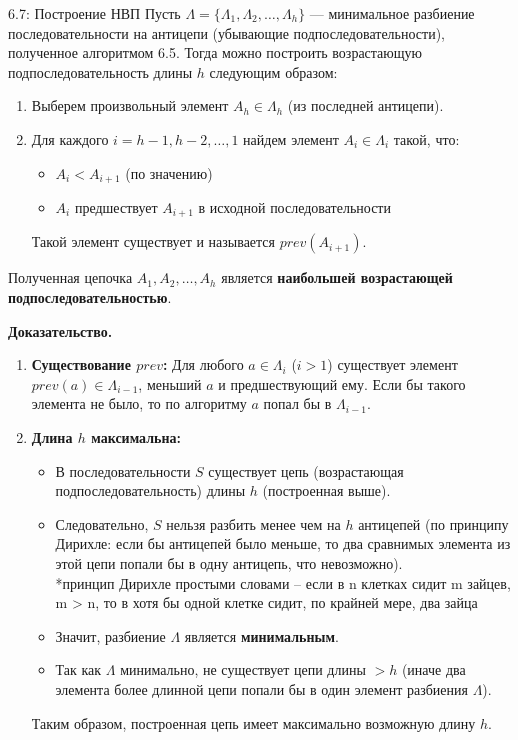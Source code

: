 \documentclass[a4paper,12pt]{article}
\newcommand{\myproof}{\textbf{Доказательство.}\ }
\begin{document}
	\begin{theorembox}{6.7: Построение НВП}
		Пусть $\Lambda = \{\Lambda_1, \Lambda_2, \dots, \Lambda_h\}$ — минимальное разбиение последовательности на антицепи (убывающие подпоследовательности), полученное алгоритмом 6.5. Тогда можно построить возрастающую подпоследовательность длины $h$ следующим образом:
		
		\begin{enumerate}
			\item Выберем произвольный элемент $A_h \in \Lambda_h$ (из последней антицепи).
			\item Для каждого $i = h-1, h-2, \dots, 1$ найдем элемент $A_i \in \Lambda_i$ такой, что:
			\begin{itemize}
				\item $A_i < A_{i+1}$ (по значению)
				\item $A_i$ предшествует $A_{i+1}$ в исходной последовательности
			\end{itemize}
			Такой элемент существует и называется $prev(A_{i+1})$.
		\end{enumerate}
		
		Полученная цепочка $A_1, A_2, \dots, A_h$ является \textbf{наибольшей возрастающей подпоследовательностью}.
	\end{theorembox}
	
	
	\myproof
	\begin{enumerate}
		\item \textbf{Существование $prev$:} Для любого $a \in \Lambda_i$ ($i > 1$) существует элемент $prev(a) \in \Lambda_{i-1}$, меньший $a$ и предшествующий ему. Если бы такого элемента не было, то по алгоритму $a$ попал бы в $\Lambda_{i-1}$.
		
		\item \textbf{Длина $h$ максимальна:} 
		\begin{itemize}
			\item В последовательности $S$ существует цепь (возрастающая подпоследовательность) длины $h$ (построенная выше).
			\item Следовательно, $S$ нельзя разбить менее чем на $h$ антицепей (по принципу Дирихле: если бы антицепей было меньше, то два сравнимых элемента из этой цепи попали бы в одну антицепь, что невозможно). \\
				
			*принцип Дирихле простыми словами – если в n клетках сидит m зайцев, m > n, то в хотя бы одной клетке сидит, по крайней мере, два зайца
			
			
			\item Значит, разбиение $\Lambda$ является \textbf{минимальным}.
			\item Так как $\Lambda$ минимально, не существует цепи длины $> h$ (иначе два элемента более длинной цепи попали бы в один элемент разбиения $\Lambda$).
		\end{itemize}
		
		Таким образом, построенная цепь имеет максимально возможную длину $h$.
	\end{enumerate}
	
\end{document}
